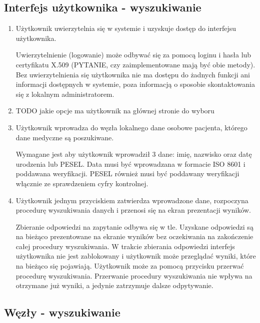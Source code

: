 \documentclass[a4paper]{report}
\begin{document}
\subsection{Interfejs użytkownika - wyszukiwanie}
\begin{enumerate}
  \item Użytkownik uwierzytelnia się w systemie i uzyskuje dostęp do interfejsu użytkownika.

    Uwierzytelnienie (logowanie) może odbywać się za pomocą loginu i hasła lub certyfikatu X.509 (PYTANIE, czy
    zaimplementowane mają być obie metody). Bez uwierzytelnienia się użytkownika nie ma dostępu do
    żadnych funkcji ani informacji dostępnych w systemie, poza informacją o sposobie skontaktowania
    się z lokalnym administratorem.

  \item TODO jakie opcje ma użytkownik na głównej stronie do wyboru
  \item Użytkownik wprowadza do węzła lokalnego dane osobowe pacjenta, którego dane medyczne są poszukiwane.

        Wymagane jest aby użytkownik wprowadził 3 dane: imię, nazwisko oraz datę urodzenia lub PESEL.
        Data musi być wprowadzana w formacie ISO 8601 i poddawana weryfikacji. PESEL również musi być
        poddawany weryfikacji włącznie ze sprawdzeniem cyfry kontrolnej.
  
  \item Użytkownik jednym przyciskiem zatwierdza wprowadzone dane, rozpoczyna procedurę wyszukiwania danych i przenosi
  się na ekran prezentacji wyników.

        Zbieranie odpowiedzi na zapytanie odbywa się w tle. Uzyskane odpowiedzi są na bieżąco prezentowane na
        ekranie wyników bez oczekiwania na zakończenie całej procedury wyszukiwania. W trakcie zbierania odpowiedzi
        interfejs użytkownika nie jest zablokowany i użytkownik może przeglądać wyniki, które na bieżąco się pojawiają.
        Użytkownik może za pomocą przycisku przerwać procedurę wyszukiwania. Przerwanie procedury wyszukiwania
        nie wpływa na otrzymane już wyniki, a jedynie zatrzymuje dalsze odpytywanie.
  
\end{enumerate}

\subsection{Węzły - wyszukiwanie}
\end{document}
